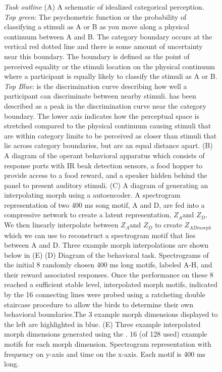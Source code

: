 \begin{figure}[tp]
\caption[Task outline]{
\emph{Task outline}
(A) A schematic of idealized categorical perception. \emph{Top green}: The psychometric function or the probability of classifying a stimuli as A or B as you move along a physical continuum between A and B. The category boundary occurs at the vertical red dotted line and there is some amount of uncertainty near this boundary. The boundary is defined as the point of perceived equality or the stimuli location on the physical continuum where a participant is equally likely to classify the stimuli as A or B. \emph{Top Blue}: is the discrimination curve describing how well a participant can discriminate between nearby stimuli. \CP has been described as a peak in the discrimination curve near the category boundary. The lower axis indicates how the perceptual space is stretched compared to the physical continuum causing stimuli that are within category limits to be perceived as closer than stimuli that lie across category boundaries, but are an equal distance apart.
(B) A diagram of the operant behavioral apparatus which consists of response ports with IR beak detection sensors, a food hopper to provide access to a food reward, and a speaker hidden behind the panel to present auditory stimuli.
(C) A diagram of generating an interpolating morph using a \DBN autoencoder. A spectrogram representation of two 400 ms song motif, A and D, are fed into a compressive network to create a latent representation, $Z_A$and $Z_D$. We then linearly interpolate between $Z_A$and $Z_D$ to create $Z_{ADmorph}$ which we can use to reconstruct a spectrogram motif that lies between A and D. Three example morph interpolations are shown below in (E)
(D) Diagram of the behavioral task. Spectrograms of the initial 8 randomly chosen 400 ms long motifs, labeled A-H, and their reward associated responses. Once the performance on these 8 reached a sufficient stable level, interpolated morph motifs, indicated by the 16 connecting lines were probed using a ratcheting double staircase procedure to allow the birds to determine their own behavioral boundaries.The 3 example morph dimensions displayed to the left are highlighted in blue.
(E) Three example interpolated morph dimensions generated using the \DBN. 16 (of 128 used) example motifs for each morph dimension. Spectrogram representation with frequency on y-axis and time on the x-axis. Each motif is 400 ms long.
}
\end{figure}


